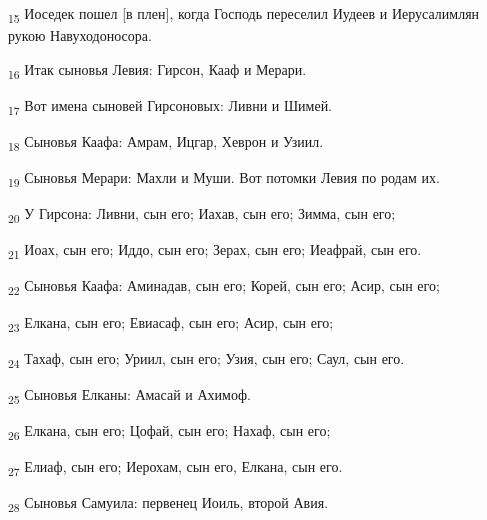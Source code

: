 \begin{tcolorbox}
\textsubscript{15} Иоседек пошел [в плен], когда Господь переселил Иудеев и Иерусалимлян рукою Навуходоносора.
\end{tcolorbox}
\begin{tcolorbox}
\textsubscript{16} Итак сыновья Левия: Гирсон, Кааф и Мерари.
\end{tcolorbox}
\begin{tcolorbox}
\textsubscript{17} Вот имена сыновей Гирсоновых: Ливни и Шимей.
\end{tcolorbox}
\begin{tcolorbox}
\textsubscript{18} Сыновья Каафа: Амрам, Ицгар, Хеврон и Узиил.
\end{tcolorbox}
\begin{tcolorbox}
\textsubscript{19} Сыновья Мерари: Махли и Муши. Вот потомки Левия по родам их.
\end{tcolorbox}
\begin{tcolorbox}
\textsubscript{20} У Гирсона: Ливни, сын его; Иахав, сын его; Зимма, сын его;
\end{tcolorbox}
\begin{tcolorbox}
\textsubscript{21} Иоах, сын его; Иддо, сын его; Зерах, сын его; Иеафрай, сын его.
\end{tcolorbox}
\begin{tcolorbox}
\textsubscript{22} Сыновья Каафа: Аминадав, сын его; Корей, сын его; Асир, сын его;
\end{tcolorbox}
\begin{tcolorbox}
\textsubscript{23} Елкана, сын его; Евиасаф, сын его; Асир, сын его;
\end{tcolorbox}
\begin{tcolorbox}
\textsubscript{24} Тахаф, сын его; Уриил, сын его; Узия, сын его; Саул, сын его.
\end{tcolorbox}
\begin{tcolorbox}
\textsubscript{25} Сыновья Елканы: Амасай и Ахимоф.
\end{tcolorbox}
\begin{tcolorbox}
\textsubscript{26} Елкана, сын его; Цофай, сын его; Нахаф, сын его;
\end{tcolorbox}
\begin{tcolorbox}
\textsubscript{27} Елиаф, сын его; Иерохам, сын его, Елкана, сын его.
\end{tcolorbox}
\begin{tcolorbox}
\textsubscript{28} Сыновья Самуила: первенец Иоиль, второй Авия.
\end{tcolorbox}
